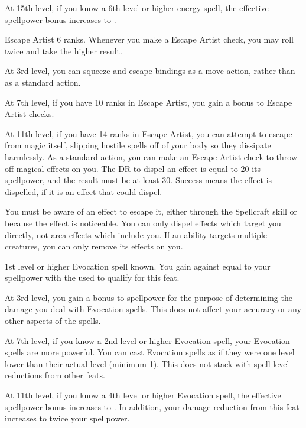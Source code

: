     At 15th level, if you know a 6th level or higher energy spell, the effective spellpower bonus increases to .

    \featpre Escape Artist 6 ranks.
    \featben Whenever you make a Escape Artist check, you may roll twice and take the higher result.

    At 3rd level, you can squeeze and escape bindings as a move action, rather than as a standard action.

    At 7th level, if you have 10 ranks in Escape Artist, you gain a  bonus to Escape Artist checks.

    At 11th level, if you have 14 ranks in Escape Artist, you can attempt to escape from magic itself, slipping hostile spells off of your body so they dissipate harmlessly.
    As a standard action, you can make an Escape Artist check to throw off magical effects on you.
    The DR to dispel an effect is equal to 20 \add its spellpower, and the result must be at least 30.
    Success means the effect is dispelled, if it is an effect that  could dispel.
    \magical

    You must be aware of an effect to escape it, either through the Spellcraft skill or because the effect is noticeable.
    You can only dispel effects which target you directly, not area effects which include you.
    If an ability targets multiple creatures, you can only remove its effects on you.

    \featpre 1st level or higher Evocation spell known.
    \featben You gain  against  equal to your spellpower with the  used to qualify for this feat.

    At 3rd level, you gain a  bonus to spellpower for the purpose of determining the damage you deal with Evocation spells.
    This does not affect your accuracy or any other aspects of the spells.

    At 7th level, if you know a 2nd level or higher Evocation spell, your Evocation spells are more powerful.
    You can cast Evocation spells as if they were one level lower than their actual level (minimum 1).
    This does not stack with spell level reductions from other feats.

    At 11th level, if you know a 4th level or higher Evocation spell, the effective spellpower bonus increases to .
    In addition, your damage reduction from this feat increases to twice your spellpower.

